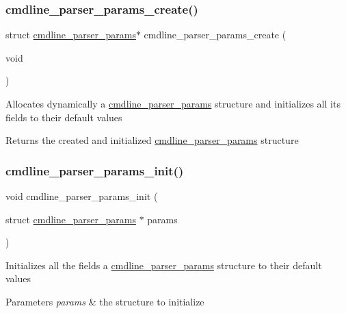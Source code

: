 \subsubsection{\texorpdfstring{cmdline\+\_\+parser\+\_\+params\+\_\+create()}{cmdline\_parser\_params\_create()}}
{\footnotesize\ttfamily struct \hyperlink{structcmdline__parser__params}{cmdline\+\_\+parser\+\_\+params}$\ast$ cmdline\+\_\+parser\+\_\+params\+\_\+create (\begin{DoxyParamCaption}\item[{void}]{ }\end{DoxyParamCaption})}

Allocates dynamically a \hyperlink{structcmdline__parser__params}{cmdline\+\_\+parser\+\_\+params} structure and initializes all its fields to their default values \begin{DoxyReturn}{Returns}
the created and initialized \hyperlink{structcmdline__parser__params}{cmdline\+\_\+parser\+\_\+params} structure 
\end{DoxyReturn}
\mbox{\label{aes-getopt_8h_af72b814611cffc706b2135ccdfe7e997}} 
\subsubsection{\texorpdfstring{cmdline\+\_\+parser\+\_\+params\+\_\+init()}{cmdline\_parser\_params\_init()}}
{\footnotesize\ttfamily void cmdline\+\_\+parser\+\_\+params\+\_\+init (\begin{DoxyParamCaption}\item[{struct \hyperlink{structcmdline__parser__params}{cmdline\+\_\+parser\+\_\+params} $\ast$}]{params }\end{DoxyParamCaption})}

Initializes all the fields a \hyperlink{structcmdline__parser__params}{cmdline\+\_\+parser\+\_\+params} structure to their default values 
\begin{DoxyParams}{Parameters}
{\em params} & the structure to initialize \\
\hline
\end{DoxyParams}
\mbox{\label{aes-getopt_8h_ad4f7db2fa4002379eb30e5206f3b7492}} 
